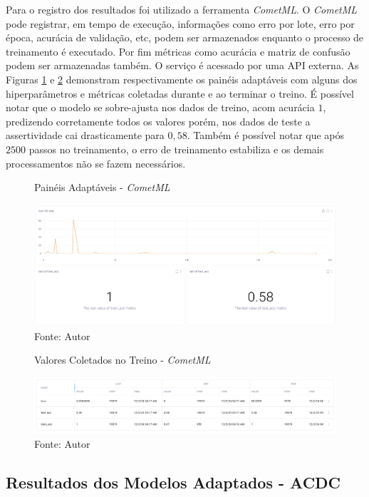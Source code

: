 Para o registro dos resultados foi utilizado a ferramenta \textit{CometML}. O \textit{CometML} pode registrar, em tempo de execução, informações como erro por lote, erro por época, acurácia de validação, etc, podem ser armazenados enquanto o processo de treinamento é executado. Por fim métricas como acurácia e matriz de confusão podem ser armazenadas também. O serviço é acessado  por uma \gls{API} externa. As Figuras \ref{fig:fig028} e \ref{fig:fig029} demonstram respectivamente os painéis adaptáveis com alguns dos hiperparâmetros e métricas coletadas durante e ao terminar o treino. É possível notar que o modelo se sobre-ajusta nos dados de treino, acom acurácia $1$, predizendo corretamente todos os valores porém, nos dados de teste a assertividade cai drasticamente para $0,58$. Também é possível notar que após $2500$ passos no treinamento, o erro de treinamento estabiliza e os demais processamentos não se fazem necessários.

\begin{figure}[h!]
    \centering
    \caption{Painéis Adaptáveis - \textit{CometML}}
    \includegraphics[width=1\textwidth]{figures/fig028.png}
    \caption*{Fonte: Autor}
    \label{fig:fig028}
\end{figure}


\begin{figure}[h!]
    \centering
    \caption{Valores Coletados no Treino - \textit{CometML}}
    \includegraphics[width=1\textwidth]{figures/fig029.png}
    \caption*{Fonte: Autor}
    \label{fig:fig029}
\end{figure}


\subsection{Resultados dos Modelos Adaptados - ACDC}
\label{subsec:resultados_acdc_adaptado}

